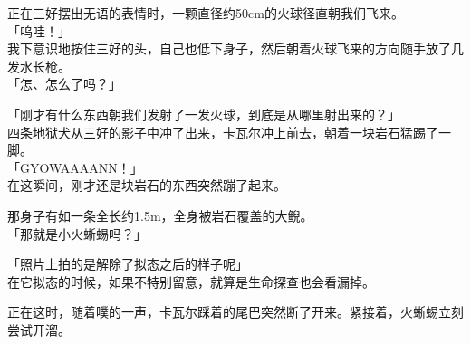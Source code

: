 正在三好摆出无语的表情时，一颗直径约50cm的火球径直朝我们飞来。\\

「呜哇！」\\

我下意识地按住三好的头，自己也低下身子，然后朝着火球飞来的方向随手放了几发水长枪。\\

「怎、怎么了吗？」

「刚才有什么东西朝我们发射了一发火球，到底是从哪里射出来的？」\\

四条地狱犬从三好的影子中冲了出来，卡瓦尔冲上前去，朝着一块岩石猛踢了一脚。\\

「GYOWAAAANN！」\\

在这瞬间，刚才还是块岩石的东西突然蹦了起来。

那身子有如一条全长约1.5m，全身被岩石覆盖的大鲵。\\

「那就是小火蜥蜴吗？」

「照片上拍的是解除了拟态之后的样子呢」\\

在它拟态的时候，如果不特别留意，就算是生命探查也会看漏掉。

正在这时，随着噗的一声，卡瓦尔踩着的尾巴突然断了开来。紧接着，火蜥蜴立刻尝试开溜。\\

